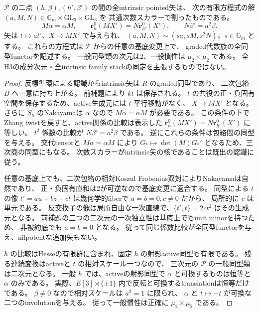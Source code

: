 \begin{theorem}[全幾何学的矢と基底変更に適合する有限係数表示]
\label{thm:normal-order2-full-arrows}
$\mathcal P$ の二点 $(h,\beta),(h',\beta')$ の間の全intrinsic pointed矢は、
次の有限方程式の解 $(a,M,N)\in\mathbb G_m\times\mathrm{GL}_3\times\mathrm{GL}_3$ を
共通次数スカラーで割ったものである。
\[
 M\alpha=\alpha M,\qquad
 \mathbf r_h^0(MX')=N\mathbf r_{h'}^0(X'),\qquad
 N\beta'=a^2\beta.
\]
矢は $t\mapsto at'$、$X\mapsto MX'$ で与えられ、
$(a,M,N)\sim(sa,sM,s^2N)$、$s\in\mathbb G_m$ とする。
これらの方程式は $\mathcal P$ からの任意の基底変更上で、
graded代数族の全同型functorを記述する。
一般同型類の次元は2、一般慣性は $\mu_2\times\mu_2$ である。
全H3の成分次元・全intrinsic family stackの同定を主張するものではない。
\end{theorem}
\begin{proof}
反標準環による認識からintrinsic矢は $R$ のgraded同型であり、
二次包絡 $B$ へ一意に持ち上がる。
前補題により $kt$ は保存される。
$t$ の共役の正・負固有空間を保存するため、active生成元には $t$ 平行移動がなく、
$X\mapsto MX'$ となる。
さらに $S_h$ のNakayamaは $\alpha$ なので $M\alpha=\alpha M$ が必要である。
この条件の下でZhang twistを戻すと、active関係の比較は表示した
$\mathbf r_h^0(MX')=N\mathbf r_{h'}^0(X')$ に等しい。
$t^2$ 係数の比較が $N\beta'=a^2\beta$ である。
逆にこれらの条件は包絡間の同型を与える。
交代tensorと $M\alpha=\alpha M$ により
$G_*\mapsto\det(M)G_*'$ となるため、三次商の同型にもなる。
次数スカラーがintrinsic矢の核であることは既出の認識に従う。

任意の基底上でも、二次包絡の相対Koszul Frobenius双対によりNakayamaは自然であり、
正・負固有直和は2が可逆なので基底変更に適合する。
同型による $t$ の像 $t'=au+bz+ct$ は幾何学的fiberで $a=b=0,c\ne0$ だから、
局所的に $c$ は単元である。
反交換子の像は局所自由な一次直線で、$\{t',t\}=2ct^2$ はその生成元となる。
前補題の三つの二次元の一次独立性は基底上でもunit minorを持つため、
非被約底でも $a=b=0$ となる。
従って同じ係数比較が全同型functorを与え、nilpotentな追加矢もない。

$h$ の比較はHesseの有限群に含まれ、固定 $h$ の射影active同型も有限である。
残る連続変換はactiveと $t$ の相対スケール一つなので、
三次元の $\mathcal P$ の一般同型類は二次元となる。
一般 $h$ では、activeの射影同型で $\alpha$ と可換するものは恒等と $\alpha$ のみである。
実際、$E[3]\rtimes\{\pm1\}$ 内で反転と可換するtranslationは恒等だけである。
$\beta\ne0$ なので相対スケールは $a^2=1$ に限られ、
$\alpha$ と $t\mapsto-t$ が可換な二つのinvolutionを与える。
従って一般慣性は正確に $\mu_2\times\mu_2$ である。
\end{proof}

